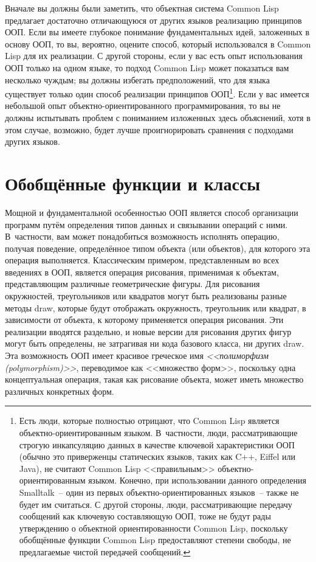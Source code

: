 Вначале вы должны были заметить, что объектная система Common Lisp предлагает достаточно
отличающуюся от других языков реализацию принципов ООП. Если вы имеете глубокое понимание
фундаментальных идей, заложенных в основу ООП, то вы, вероятно, оцените способ, который
использовался в Common Lisp для их реализации.  С другой стороны, если у вас есть опыт
использования ООП только на одном языке, то подход Common Lisp может показаться вам
несколько чуждым; вы должны избегать предположений, что для языка существует только один
способ реализации принципов ООП\footnote{Есть люди, которые полностью отрицают, что Common
  Lisp является объектно-ориентированным языком.  В~частности, люди, рассматривающие
  строгую инкапсуляцию данных в качестве ключевой характеристики ООП (обычно это
  приверженцы статических языков, таких как C++, Eiffel или Java), не считают Common Lisp
  <<правильным>> объектно-ориентированным языком.  Конечно, при использовании данного
  определения Smalltalk~-- один из первых объектно-ориентированных языков~-- также не будет
  им считаться.  С другой стороны, люди, рассматривающие передачу сообщений как ключевую
  составляющую ООП, тоже не будут рады утверждению о объектной ориентированности Common
  Lisp, поскольку обобщённые функции Common Lisp предоставляют степени свободы, не
  предлагаемые чистой передачей сообщений.}.  Если у вас имеется небольшой опыт
объектно-ориентированного программирования, то вы не должны испытывать проблем с
пониманием изложенных здесь объяснений, хотя в этом случае, возможно, будет лучше
проигнорировать сравнения с подходами других языков.

\section{Обобщённые функции и классы}

Мощной и фундаментальной особенностью ООП является способ организации программ путём
определения типов данных и связывании операций с ними.  В~частности, вам может
понадобиться возможность исполнять операцию, получая поведение, определённое типом объекта
(или объектов), для которого эта операция выполняется. Классическим примером, представленным
во всех введениях в ООП, является операция рисования, применимая к объектам,
представляющим различные геометрические фигуры.  Для рисования окружностей, треугольников
или квадратов могут быть реализованы разные методы draw, которые будут отображать
окружность, треугольник или квадрат, в зависимости от объекта, к которому применяется
операция рисования. Эти реализации вводятся раздельно, и новые версии для рисования других
фигур могут быть определены, не затрагивая ни кода базового класса, ни других draw.  Эта
возможность ООП имеет красивое греческое имя \textit{<<полиморфизм (polymorphism)>>},
переводимое как <<множество форм>>, поскольку одна концептуальная операция, такая как
рисование объекта, может иметь множество различных конкретных форм.

